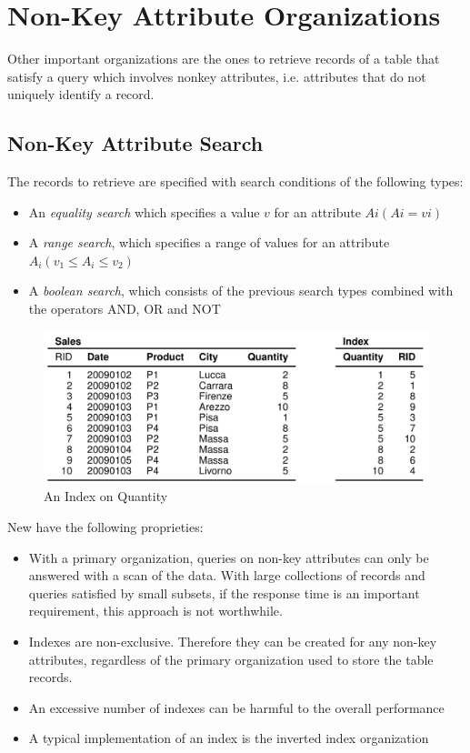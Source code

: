 \chapter{Non-Key Attribute Organizations}
Other important organizations are the ones to retrieve records of a table that satisfy a query which involves nonkey attributes, i.e. attributes that do not uniquely identify a record.

\section{Non-Key Attribute Search}
The records to retrieve are specified with search conditions of the following types:
\begin{itemize}
    \item An \textit{equality search} which specifies a value \(v\) for an attribute \(Ai (Ai = vi)\)
    \item A \textit{range search}, which specifies a range of values for an attribute \(A_i (v_1 \leq A_i \leq v_2)\)
    \item A \textit{boolean search}, which consists of the previous search types combined with the operators AND, OR and NOT
\end{itemize}

\begin{figure}[!h]
    \centering
    \includegraphics[width=0.7\linewidth]{images/DBMS_Internals/NonKeyAttributeOrganizations/index_on_quantity.jpeg}
    \caption{An Index on Quantity}
\end{figure}

New have the following proprieties:
\begin{itemize}
    \item With a primary organization, queries on non-key attributes can only be answered with a scan of the data. With large collections of records and queries satisfied by small subsets, if the response time is an important requirement, this approach is not worthwhile.
    \item Indexes are non-exclusive. Therefore they can be created for any non-key attributes, regardless of the primary organization used to store the table records.
    \item An excessive number of indexes can be harmful to the overall performance
    \item A typical implementation of an index is the inverted index organization
\end{itemize}


